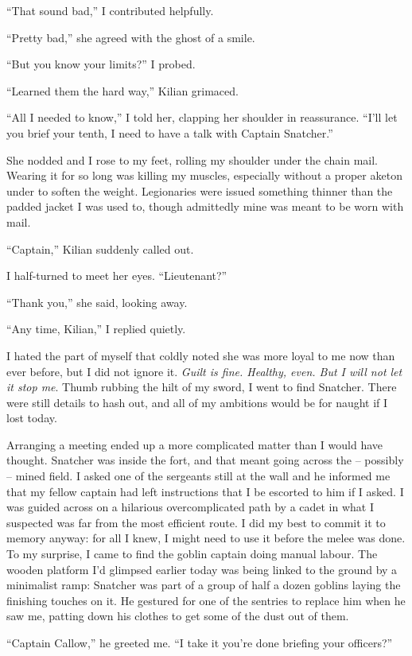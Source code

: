 \documentclass[12pt, openany]{book}
\begin{document}
“That sound bad,” I contributed helpfully.

“Pretty bad,” she agreed with the ghost of a smile.

“But you know your limits?” I probed.

“Learned them the hard way,” Kilian grimaced.

“All I needed to know,” I told her, clapping her shoulder in reassurance. “I’ll let you brief your tenth, I need to have a talk with Captain Snatcher.”

She nodded and I rose to my feet, rolling my shoulder under the chain mail. Wearing it for so long was killing my muscles, especially without a proper aketon under to soften the weight. Legionaries were issued something thinner than the padded jacket I was used to, though admittedly mine was meant to be worn with mail.

“Captain,” Kilian suddenly called out.

I half-turned to meet her eyes. “Lieutenant?”

“Thank you,” she said, looking away.

“Any time, Kilian,” I replied quietly.

I hated the part of myself that coldly noted she was more loyal to me now than ever before, but I did not ignore it. \textit{Guilt is fine. Healthy, even. But I will not let it stop me}. Thumb rubbing the hilt of my sword, I went to find Snatcher. There were still details to hash out, and all of my ambitions would be for naught if I lost today.

Arranging a meeting ended up a more complicated matter than I would have thought. Snatcher was inside the fort, and that meant going across the – possibly – mined field. I asked one of the sergeants still at the wall and he informed me that my fellow captain had left instructions that I be escorted to him if I asked. I was guided across on a hilarious overcomplicated path by a cadet in what I suspected was far from the most efficient route. I did my best to commit it to memory anyway: for all I knew, I might need to use it before the melee was done. To my surprise, I came to find the goblin captain doing manual labour. The wooden platform I’d glimpsed earlier today was being linked to the ground by a minimalist ramp: Snatcher was part of a group of half a dozen goblins laying the finishing touches on it. He gestured for one of the sentries to replace him when he saw me, patting down his clothes to get some of the dust out of them.

“Captain Callow,” he greeted me. “I take it you’re done briefing your officers?”
\end{document}
